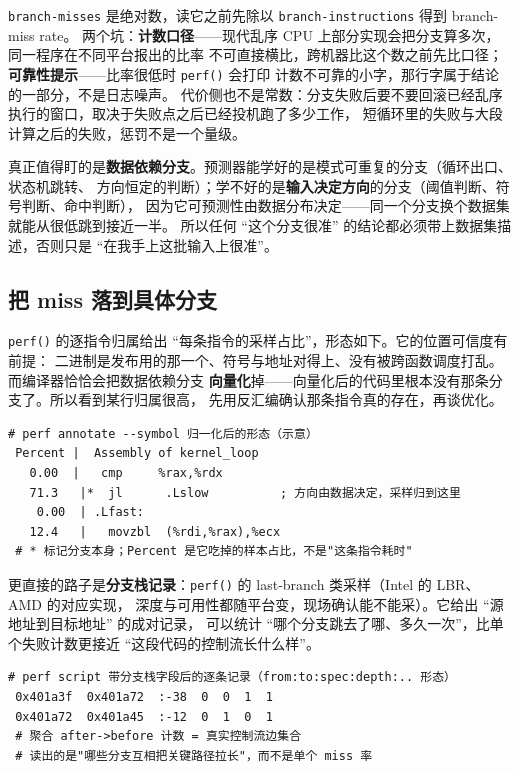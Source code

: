 \documentclass[12pt,a4paper,fontset=fandol]{ctexbook}
\newcommand{\Fn}[1]{\texttt{#1()}}
\newcommand{\Tp}[1]{\texttt{#1}}
\newcommand{\Bk}{\discretionary{}{}{}}
\newcommand{\Mx}[1]{\textsf{#1}}
\begin{document}
\Tp{branch{\Bk}-misses} 是绝对数，读它之前先除以 \Tp{branch{\Bk}-instructions} 得到 \Mx{branch{\Bk}-miss rate}。
两个坑：\textbf{计数口径}——现代乱序 CPU 上部分实现会把分支算多次，同一程序在不同平台报出的比率
不可直接横比，跨机器比这个数之前先比口径；\textbf{可靠性提示}——比率很低时 \Fn{perf} 会打印
计数不可靠的小字，那行字属于结论的一部分，不是日志噪声。
代价侧也不是常数：分支失败后要不要回滚已经乱序执行的窗口，取决于失败点之后已经投机跑了多少工作，
短循环里的失败与大段计算之后的失败，惩罚不是一个量级。

真正值得盯的是\textbf{数据依赖分支}。预测器能学好的是模式可重复的分支（循环出口、状态机跳转、
方向恒定的判断）；学不好的是\textbf{输入决定方向}的分支（阈值判断、符号判断、命中判断），
因为它可预测性由数据分布决定——同一个分支换个数据集就能从很低跳到接近一半。
所以任何 ``这个分支很准'' 的结论都必须带上数据集描述，否则只是 ``在我手上这批输入上很准''。

\subsection{把 miss 落到具体分支}

\Fn{perf} 的逐指令归属给出 ``每条指令的采样占比''，形态如下。它的位置可信度有前提：
二进制是发布用的那一个、符号与地址对得上、没有被跨函数调度打乱。而编译器恰恰会把数据依赖分支
\textbf{向量化}掉——向量化后的代码里根本没有那条分支了。所以看到某行归属很高，
先用反汇编确认那条指令真的存在，再谈优化。

\begin{lstlisting}[style=outstyle,caption={指令级分支归属的形态（格式示例，非本仓库实测值）},label={lst:pm06-annotate}]
 # perf annotate --symbol 归一化后的形态（示意）
 Percent |  Assembly of kernel_loop
   0.00  |   cmp     %rax,%rdx
   71.3   |*  jl      .Lslow          ; 方向由数据决定，采样归到这里
    0.00  | .Lfast:
   12.4   |   movzbl  (%rdi,%rax),%ecx
 # * 标记分支本身；Percent 是它吃掉的样本占比，不是"这条指令耗时"
\end{lstlisting}

更直接的路子是\textbf{分支栈记录}：\Fn{perf} 的 last-branch 类采样（Intel 的 LBR、AMD 的对应实现，
深度与可用性都随平台变，现场确认能不能采）。它给出 ``源地址到目标地址'' 的成对记录，
可以统计 ``哪个分支跳去了哪、多久一次''，比单个失败计数更接近 ``这段代码的控制流长什么样''。

\begin{lstlisting}[style=outstyle,caption={分支栈记录聚合后的形态（格式示例，非本仓库实测值）},label={lst:pm06-brstack}]
 # perf script 带分支栈字段后的逐条记录（from:to:spec:depth:.. 形态）
 0x401a3f  0x401a72  :-38  0  0  1  1
 0x401a72  0x401a45  :-12  0  1  0  1
 # 聚合 after->before 计数 = 真实控制流边集合
 # 读出的是"哪些分支互相把关键路径拉长"，而不是单个 miss 率
\end{lstlisting}
\end{document}
